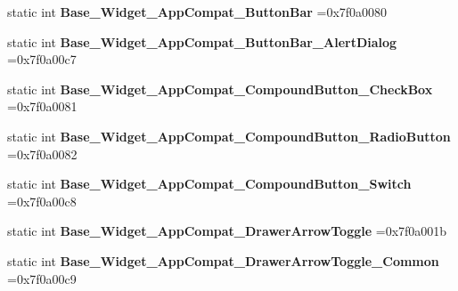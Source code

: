 \begin{DoxyCompactItemize}
\item 
\mbox{\label{classandroid_1_1support_1_1v7_1_1cardview_1_1R_1_1style_a5b5cbd1fbbfd30ad6f350c5b3819f249}} 
static int {\bfseries Base\+\_\+\+Widget\+\_\+\+App\+Compat\+\_\+\+Button\+Bar} =0x7f0a0080
\item 
\mbox{\label{classandroid_1_1support_1_1v7_1_1cardview_1_1R_1_1style_ad90af2a56fec45d9d0bd79dd9ea94bc1}} 
static int {\bfseries Base\+\_\+\+Widget\+\_\+\+App\+Compat\+\_\+\+Button\+Bar\+\_\+\+Alert\+Dialog} =0x7f0a00c7
\item 
\mbox{\label{classandroid_1_1support_1_1v7_1_1cardview_1_1R_1_1style_ad67bbab9450eeb61522ef1ce70a165ff}} 
static int {\bfseries Base\+\_\+\+Widget\+\_\+\+App\+Compat\+\_\+\+Compound\+Button\+\_\+\+Check\+Box} =0x7f0a0081
\item 
\mbox{\label{classandroid_1_1support_1_1v7_1_1cardview_1_1R_1_1style_a1660c0bb3a4ba96c7e5fdef89784afff}} 
static int {\bfseries Base\+\_\+\+Widget\+\_\+\+App\+Compat\+\_\+\+Compound\+Button\+\_\+\+Radio\+Button} =0x7f0a0082
\item 
\mbox{\label{classandroid_1_1support_1_1v7_1_1cardview_1_1R_1_1style_aeb01678be751481b4729d78dc66b24ad}} 
static int {\bfseries Base\+\_\+\+Widget\+\_\+\+App\+Compat\+\_\+\+Compound\+Button\+\_\+\+Switch} =0x7f0a00c8
\item 
\mbox{\label{classandroid_1_1support_1_1v7_1_1cardview_1_1R_1_1style_acf613ee66305c409a91dca147d5c7d4e}} 
static int {\bfseries Base\+\_\+\+Widget\+\_\+\+App\+Compat\+\_\+\+Drawer\+Arrow\+Toggle} =0x7f0a001b
\item 
\mbox{\label{classandroid_1_1support_1_1v7_1_1cardview_1_1R_1_1style_a2c9410b96d90295a28a6e407a315a4f9}} 
static int {\bfseries Base\+\_\+\+Widget\+\_\+\+App\+Compat\+\_\+\+Drawer\+Arrow\+Toggle\+\_\+\+Common} =0x7f0a00c9
\item 

\end{DoxyCompactItemize}
